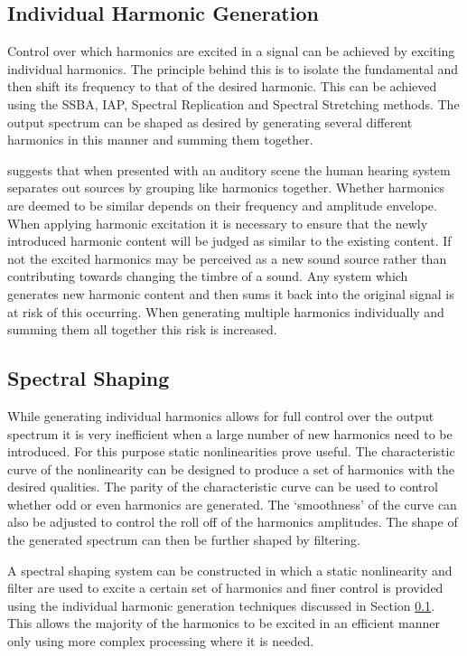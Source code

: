 	\subsection{Individual Harmonic Generation}
	\label{sec:FeatureControl-Systems-Individuals}
		Control over which harmonics are excited in a signal can be achieved by exciting individual harmonics. The
		principle behind this is to isolate the fundamental and then shift its frequency to that of the desired
		harmonic. This can be achieved using the SSBA, IAP, Spectral Replication and Spectral Stretching methods.
		The output spectrum can be shaped as desired by generating several different harmonics in this manner and
		summing them together.
		
		\citet{bregman1994auditory} suggests that when presented with an auditory scene the human hearing system
		separates out sources by grouping like harmonics together. Whether harmonics are deemed to be similar
		depends on their frequency and amplitude envelope. When applying harmonic excitation it is necessary to
		ensure that the newly introduced harmonic content will be judged as similar to the existing content. If not
		the excited harmonics may be perceived as a new sound source rather than contributing towards changing the
		timbre of a sound. Any system which generates new harmonic content and then sums it back into the original
		signal is at risk of this occurring. When generating multiple harmonics individually and summing them all
		together this risk is increased.

	\subsection{Spectral Shaping}
	\label{sec:FeatureControl-Systems-SpectralShaping}
		While generating individual harmonics allows for full control over the output spectrum it is very
		inefficient when a large number of new harmonics need to be introduced. For this purpose static
		nonlinearities prove useful. The characteristic curve of the nonlinearity can be designed to produce a set
		of harmonics with the desired qualities. The parity of the characteristic curve can be used to control
		whether odd or even harmonics are generated. The `smoothness' of the curve can also be adjusted to control
		the roll off of the harmonics amplitudes. The shape of the generated spectrum can then be further shaped by
		filtering.

		A spectral shaping system can be constructed in which a static nonlinearity and filter are used to excite a
		certain set of harmonics and finer control is provided using the individual harmonic generation techniques
		discussed in Section \ref{sec:FeatureControl-Systems-Individuals}. This allows the majority of the
		harmonics to be excited in an efficient manner only using more complex processing where it is needed.

